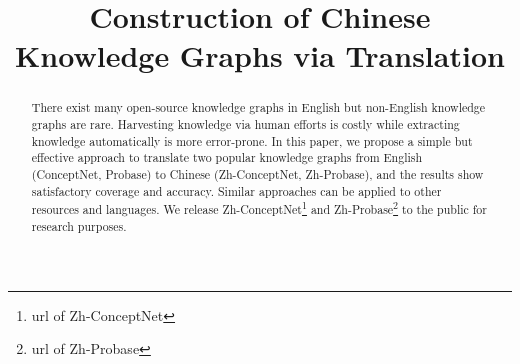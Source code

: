 \documentclass[11pt,a4paper]{article}
\title{Construction of Chinese Knowledge Graphs via Translation}
\newcommand{\zhcon}{Zh-ConceptNet\xspace}
\newcommand{\zhpro}{Zh-Probase\xspace}
\newcommand{\con}{ConceptNet\xspace}
\newcommand{\pro}{Probase\xspace}
\newcommand{\TD}[1]{\textcolor{red}{#1}}
\begin{document}
\maketitle
\begin{abstract}
There exist many open-source knowledge graphs in English but non-English knowledge graphs 
are rare. 
Harvesting knowledge via human efforts is costly while extracting knowledge automatically is more error-prone. 
In this paper, we propose a simple but effective approach to translate
two popular knowledge graphs from English (\con, \pro) to Chinese (\zhcon, \zhpro), 
and the results show satisfactory coverage and accuracy. 
Similar approaches can be applied to other resources and languages. 
We release \zhcon \footnote{url of \zhcon } and \zhpro \footnote{url of \zhpro} 
to the public for research purposes. 
\end{abstract}

\begin{CJK}{UTF8}{gkai}
	
	
	
	
	
	
\end{CJK}
\end{document}
